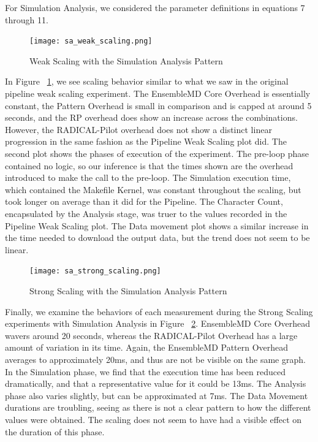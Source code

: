 \documentclass[]{article}
\begin{document}
			For Simulation Analysis, we considered the parameter definitions in equations 7 through 11.

			\begin{samepage}
				\begin{figure}[H]
					\centering
					\texttt{[image: sa\_weak\_scaling.png]}
					\caption{Weak Scaling with the Simulation Analysis Pattern}
					\label{fig:sa_weak_scaling}
				\end{figure}

				In Figure ~\ref{fig:sa_weak_scaling}, we see scaling behavior similar to what we saw in the original pipeline weak scaling experiment. The EnsembleMD Core Overhead is essentially constant, the Pattern Overhead is small in comparison and is capped at around 5 seconds, and the RP overhead does show an increase across the combinations. However, the RADICAL-Pilot overhead does not show a distinct linear progression in the same fashion as the Pipeline Weak Scaling plot did. 
				The second plot shows the phases of execution of the experiment. The pre-loop phase contained no logic, so our inference is that the times shown are the overhead introduced to make the call to the pre-loop. The Simulation execution time, which contained the Makefile Kernel, was constant throughout the scaling, but took longer on average than it did for the Pipeline. The Character Count, encapsulated by the Analysis stage, was truer to the values recorded in the Pipeline Weak Scaling plot.
				The Data movement plot shows a similar increase in the time needed to download the output data, but the trend does not seem to be linear. 
			\end{samepage}

			\begin{figure}[H]
				\centering
				\texttt{[image: sa\_strong\_scaling.png]}
				\caption{Strong Scaling with the Simulation Analysis Pattern}
				\label{fig:sa_strong_scaling}
			\end{figure}
			
			Finally, we examine the behaviors of each measurement during the Strong Scaling experiments with Simulation Analysis in Figure ~\ref{fig:sa_strong_scaling}. EnsembleMD Core Overhead wavers around 20 seconds, whereas the RADICAL-Pilot Overhead has a large amount of variation in its time. Again, the EnsembleMD Pattern Overhead averages to approximately 20ms, and thus are not be visible on the same graph.
			In the Simulation phase, we find that the execution time has been reduced dramatically, and that a representative value for it could be 13ms. The Analysis phase also varies slightly, but can be approximated at 7ms.
			The Data Movement durations are troubling, seeing as there is not a clear pattern to how the different values were obtained. The scaling does not seem to have had a visible effect on the duration of this phase.
\end{document}
